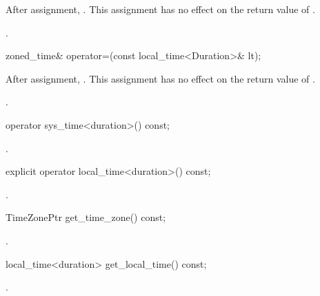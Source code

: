 \begin{itemdescr}
\pnum
\effects
After assignment, .
This assignment has no effect on the return value of .

\pnum
\returns {}.
\end{itemdescr}

%
\begin{itemdecl}
zoned_time& operator=(const local_time<Duration>& lt);
\end{itemdecl}

\begin{itemdescr}
\pnum
\effects
After assignment, .
This assignment has no effect on the return value of .

\pnum
\returns {}.
\end{itemdescr}

%
\begin{itemdecl}
operator sys_time<duration>() const;
\end{itemdecl}

\begin{itemdescr}
\pnum
\returns {}.
\end{itemdescr}

%
\begin{itemdecl}
explicit operator local_time<duration>() const;
\end{itemdecl}

\begin{itemdescr}
\pnum
\returns {}.
\end{itemdescr}

%
\begin{itemdecl}
TimeZonePtr get_time_zone() const;
\end{itemdecl}

\begin{itemdescr}
\pnum
\returns {}.
\end{itemdescr}

%
\begin{itemdecl}
local_time<duration> get_local_time() const;
\end{itemdecl}

\begin{itemdescr}
\pnum
\returns {}.
\end{itemdescr}

